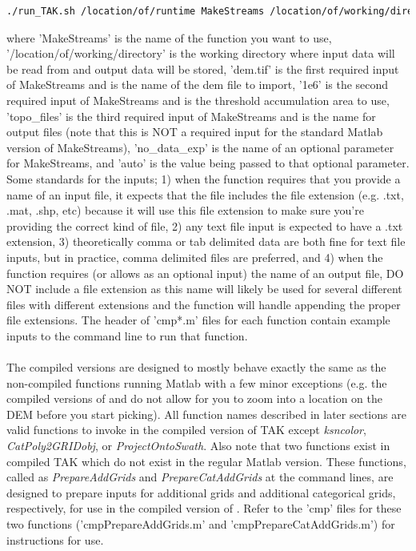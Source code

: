 \begin{lstlisting}[language=bash]
./run_TAK.sh /location/of/runtime MakeStreams /location/of/working/directory dem.tif 1e6 topo_files no_data_exp auto
\end{lstlisting}

\noindent
where 'MakeStreams' is the name of the function you want to use, '/location/of/working/directory' is the working directory where input data will be read from and output data will be stored, 'dem.tif' is the first required input of MakeStreams and is the name of the dem file to import, '1e6' is the second required input of MakeStreams and is the threshold accumulation area to use, 'topo\_files' is the third required input of MakeStreams and is the name for output files (note that this is NOT a required input for the standard Matlab version of MakeStreams), 'no\_data\_exp' is the name of an optional parameter for MakeStreams, and 'auto' is the value being passed to that optional parameter. Some standards for the inputs; 1)  when the function requires that you provide a name of an input file, it expects that the file includes the file extension (e.g. .txt, .mat, .shp, etc) because it will use this file extension to make sure you're providing the correct kind of file, 2) any text file input is expected to have a .txt extension, 3) theoretically comma or tab delimited data are both fine for text file inputs, but in practice, comma delimited files are preferred, and 4) when the function requires (or allows as an optional input) the name of an output file, DO NOT include a file extension as this name will likely be used for several different files with different extensions and the function will handle appending the proper file extensions. The header of 'cmp*.m' files for each function contain example inputs to the command line to run that function.

\paragraph{}The compiled versions are designed to mostly behave exactly the same as the non-compiled functions running Matlab with a few minor exceptions (e.g. the compiled versions of  and  do not allow for you to zoom into a location on the DEM before you start picking). All function names described in later sections are valid functions to invoke in the compiled version of TAK except \textit{ksncolor}, \textit{CatPoly2GRIDobj}, or \textit{ProjectOntoSwath}. Also note that two functions exist in compiled TAK which do not exist in the regular Matlab version. These functions, called as \textit{PrepareAddGrids} and \textit{PrepareCatAddGrids} at the command lines, are designed to prepare inputs for additional grids and additional categorical grids, respectively, for use in the compiled version of . Refer to the 'cmp' files for these two functions ('cmpPrepareAddGrids.m' and 'cmpPrepareCatAddGrids.m') for instructions for use. 

